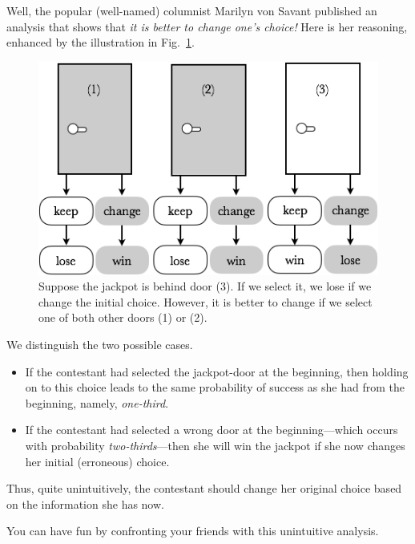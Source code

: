 Well, the popular (well-named) columnist Marilyn von Savant
published an analysis that shows that {\em it is better to change one's choice!}  
Here is her reasoning, enhanced by the illustration in Fig.~\ref{fig:MonthyHall-2}.
\begin{figure}[htb]
\begin{center}
        \includegraphics[scale=0.4]{FiguresMaths/MonthyHall}
        \caption{Suppose the jackpot is behind door (3). 
        If we select it, we lose if we change the initial choice.
        However, it is better to change if we select one of both other doors (1) or (2).}
        \label{fig:MonthyHall-2}
\end{center}
\end{figure}
We distinguish the two possible cases.
\begin{itemize}
\item
If the contestant had selected the jackpot-door at the beginning, then
holding on to this choice leads to the same probability of success as
she had from the beginning, namely, {\em one-third}.
\item
If the contestant had selected a wrong door at the beginning---which
occurs with probability {\em two-thirds}---then she will win the
jackpot if she now changes her initial (erroneous) choice.
\end{itemize}
Thus, quite unintuitively, the contestant should change her original
choice based on the information she has now.

\smallskip

You can have fun by confronting your friends with this unintuitive analysis.

\medskip

